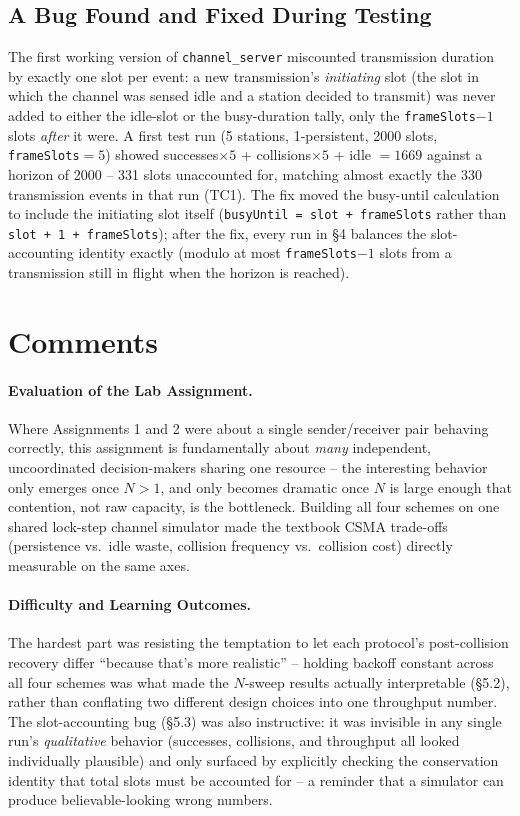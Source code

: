 \documentclass[11pt]{article}
\begin{document}
\subsection{A Bug Found and Fixed During Testing}
The first working version of \texttt{channel\_server} miscounted transmission duration by
exactly one slot per event: a new transmission's \emph{initiating} slot (the slot in which
the channel was sensed idle and a station decided to transmit) was never added to either the
idle-slot or the busy-duration tally, only the \texttt{frameSlots}$-1$ slots \emph{after} it
were. A first test run (5 stations, 1-persistent, 2000 slots, \texttt{frameSlots}$=5$)
showed successes$\times5$ + collisions$\times5$ + idle $= 1669$ against a horizon of 2000 --
331 slots unaccounted for, matching almost exactly the 330 transmission events in that run
(TC1). The fix moved the busy-until calculation to include the initiating slot itself
(\texttt{busyUntil = slot + frameSlots} rather than \texttt{slot + 1 + frameSlots}); after
the fix, every run in \S4 balances the slot-accounting identity exactly (modulo at most
\texttt{frameSlots}$-1$ slots from a transmission still in flight when the horizon is
reached).

\section{Comments}

\paragraph{Evaluation of the Lab Assignment.} Where Assignments 1 and 2 were about a single
sender/receiver pair behaving correctly, this assignment is fundamentally about \emph{many}
independent, uncoordinated decision-makers sharing one resource -- the interesting behavior
only emerges once $N>1$, and only becomes dramatic once $N$ is large enough that contention,
not raw capacity, is the bottleneck. Building all four schemes on one shared lock-step
channel simulator made the textbook CSMA trade-offs (persistence vs.\ idle waste, collision
frequency vs.\ collision cost) directly measurable on the same axes.

\paragraph{Difficulty and Learning Outcomes.} The hardest part was resisting the temptation
to let each protocol's post-collision recovery differ ``because that's more realistic'' --
holding backoff constant across all four schemes was what made the $N$-sweep results
actually interpretable (\S5.2), rather than conflating two different design choices into one
throughput number. The slot-accounting bug (\S5.3) was also instructive: it was invisible in
any single run's \emph{qualitative} behavior (successes, collisions, and throughput all
looked individually plausible) and only surfaced by explicitly checking the conservation
identity that total slots must be accounted for -- a reminder that a simulator can produce
believable-looking wrong numbers.
\end{document}
